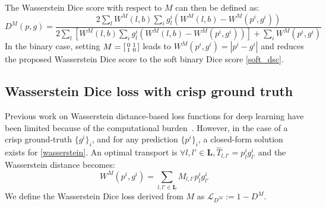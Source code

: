 \documentclass[runningheads,orivec,a4paper]{llncs}
\begin{document}
\noindent The Wasserstein Dice score with respect to $M$ can then be defined as:
\begin{equation}\label{generalised dice}
D^M(p, g) = \frac{ 2\sum_{l} W^M(l, b)\sum_{i} g^i_l(W^M(l, b) - W^M(p^i, g^i))}{2\sum_{l}[ W^M(l, b)\sum_{i} g^i_l(W^M(l, b) - W^M(p^i, g^i)) ] + \sum_{i} W^M(p^i, g^i)}
\end{equation}
In the binary case, setting  
$M= \begin{bsmallmatrix}
0       & 1  \\
1       & 0  \\
\end{bsmallmatrix}$ leads to $W^M(p^i,g^i)=|p^i-g^i|$ and reduces the proposed
Wasserstein Dice score to the soft binary Dice score
\eqref{soft_dsc}. 

\subsection{Wasserstein Dice loss with crisp ground truth}
Previous work on Wasserstein distance-based loss functions for deep
learning have been limited because of the computational
burden~\cite{fast_emd}. However, in the case of a crisp
ground-truth $\{g^i\}_i$, and for any prediction $\{p^i\}_i$, a
closed-form solution exists for \eqref{wasserstein}.
An optimal transport is $\forall l,l' \in \mathbf{L},
\hat{T}_{l,l'}=p^i_lg^i_{l'}$ and the Wasserstein distance becomes: 
\begin{equation}\label{wass_closed-form}
W^M(p^i, g^i) = \sum_{l,l' \in \mathbf{L}} M_{l,l'}p^i_lg^i_{l'}
\end{equation}
We define the Wasserstein Dice loss derived from $M$ as $\mathcal{L}_{D^M}:=1-D^M$.
\end{document}
